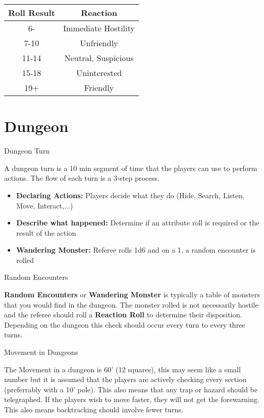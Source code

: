 \documentclass[18pt]{article}
\begin{document}
\begin{multicols}{2}
\begin{table}[H]
\begin{center}
\begin{tabular}{ c  c  }
\textbf{
Roll Result} &\textbf{ Reaction}\\
\bottomrule
\bottomrule

6- & Immediate Hostility \\

7-10 &  Unfriendly\\

11-14 & Neutral, Suspicious \\

15-18 & Uninterested \\

19+ & Friendly \\


\end{tabular}
\end{center}
\label{table:RollingAttributes}
\vspace{-1cm}
\end{table}


\section*{Dungeon}
\begin{mercHeading}
Dungeon Turn
\end{mercHeading}
A dungeon turn is a 10 min segment of time that the players can use to perform actions. The flow of each turn is a 3-step process.
\begin{itemize}
\setlength\itemsep{0em}
	\item \textbf{Declaring Actions:} Players decide what they do (Hide, Search, Listen, Move, Interact,...)
	\item \textbf{Describe what happened:} Determine if an attribute roll is required or the result of the action
	\item \textbf{Wandering Monster:} Referee rolls 1d6 and on a 1, a random encounter is rolled
\end{itemize}
\begin{mercHeading}
Random Encounters
\end{mercHeading}
\textbf{Random Encounters} or \textbf{Wandering Monster} is typically a table of monsters that you would find in the dungeon. The monster rolled is not necessarily hostile and the referee should roll a \textbf{Reaction Roll} to determine their disposition. Depending on the dungeon this check should occur every turn to every three turns.

\begin{mercHeading}
Movement in Dungeons
\end{mercHeading}
The Movement in a dungeon is 60' (12 squares), this may seem like a small number but it is assumed that the players are actively checking every section (preferrably with a 10' pole). This also means that any trap or hazard should be telegraphed. If the players wish to move faster, they will not get the forewarning. This also means backtracking should involve fewer turns. 



\end{multicols}
\end{document}
